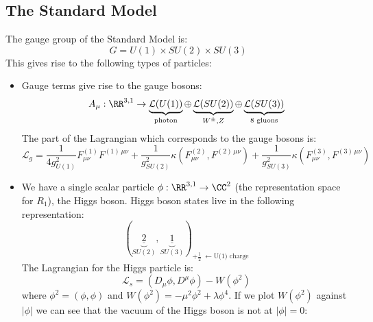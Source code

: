 \documentclass{jknotes}
\begin{document}
\subsection{The Standard Model}
The gauge group of the Standard Model is:
\begin{equation}
    G = U(1) \times SU(2) \times SU(3)
\end{equation}
This gives rise to the following types of particles:
\begin{itemize}
    \item Gauge terms give rise to the gauge bosons:
        \begin{equation}
            A_\mu : \RR^{3,1} \rightarrow \underbrace{\mathcal{L}(U(1))}_\text{photon} \oplus \underbrace{\mathcal{L}(SU(2))}_{W^\pm,Z} \oplus \underbrace{\mathcal{L}(SU(3))}_\text{8 gluons}
        \end{equation}
        The part of the Lagrangian which corresponds to the gauge bosons is:
        \begin{equation}
            \mathcal{L}_g = \frac{1}{4g^2_{U(1)}}F^{(1)}_{\mu\nu}F^{(1)\,\mu\nu}
            + \frac{1}{g^2_{SU(2)}} \kappa\left(F^{(2)}_{\mu\nu},F^{(2)\,\mu\nu}\right)
            + \frac{1}{g^2_{SU(3)}} \kappa\left(F^{(3)}_{\mu\nu},F^{(3)\,\mu\nu}\right)
        \end{equation}
    \item We have a single scalar particle \(\phi:\RR^{3,1} \rightarrow\CC^2\) (the representation space for \(R_1\)), the Higgs boson. Higgs boson states live in the following representation:
        \begin{equation}
            (\underbrace{\underline{2}}_{SU(2)},\underbrace{\underline{1}}_{SU(3)})_{+\frac{1}{2}\;\leftarrow\text{U(1) charge}}
        \end{equation}
        The Lagrangian for the Higgs particle is:
        \begin{equation}
            \mathcal{L}_s = (D_\mu\phi,D^\mu\phi)-W(\phi^2)
        \end{equation}
        where \(\phi^2=(\phi,\phi)\) and \(W(\phi^2) = -\mu^2\phi^2+\lambda\phi^4\). If we plot \(W(\phi^2)\) against \(|\phi|\) we can see that the vacuum of the Higgs boson is not at \(|\phi|=0\):
        \begin{figure}[H]
            \centering
\end{figure}
\end{itemize}
\end{document}
